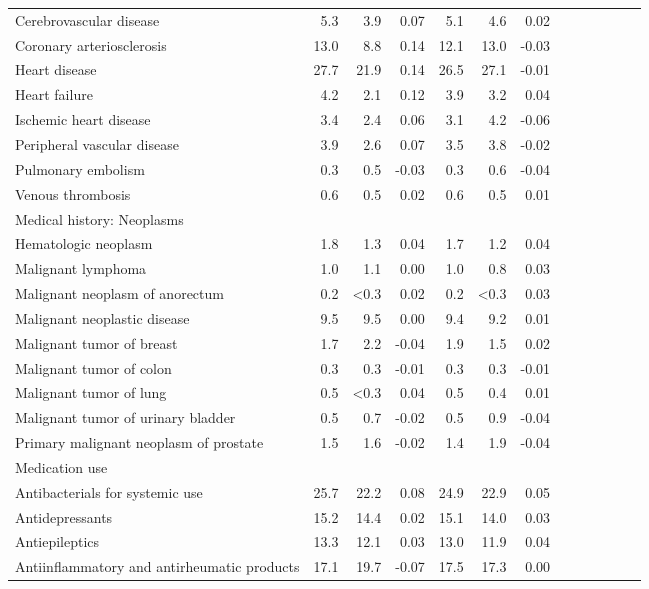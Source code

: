 \documentclass[11pt,]{article}
\begin{document}
\begin{longtable}{lrrrrrrrrrrrr}
      Cerebrovascular disease &  5.3 &  3.9 &  0.07 &  5.1 &  4.6 &  0.02 \\ 
      Coronary arteriosclerosis & 13.0 &  8.8 &  0.14 & 12.1 & 13.0 & -0.03 \\ 
      Heart disease & 27.7 & 21.9 &  0.14 & 26.5 & 27.1 & -0.01 \\ 
      Heart failure &  4.2 &  2.1 &  0.12 &  3.9 &  3.2 &  0.04 \\ 
      Ischemic heart disease &  3.4 &  2.4 &  0.06 &  3.1 &  4.2 & -0.06 \\ 
      Peripheral vascular disease &  3.9 &  2.6 &  0.07 &  3.5 &  3.8 & -0.02 \\ 
      Pulmonary embolism &  0.3 &  0.5 & -0.03 &  0.3 &  0.6 & -0.04 \\ 
      Venous thrombosis &  0.6 &  0.5 &  0.02 &  0.6 &  0.5 &  0.01 \\ 
  Medical history: Neoplasms &    &    &     &    &    &     \\ 
      Hematologic neoplasm &  1.8 &  1.3 &  0.04 &  1.7 &  1.2 &  0.04 \\ 
      Malignant lymphoma &  1.0 &  1.1 &  0.00 &  1.0 &  0.8 &  0.03 \\ 
      Malignant neoplasm of anorectum &  0.2 & <0.3 &  0.02 &  0.2 & <0.3 &  0.03 \\ 
      Malignant neoplastic disease &  9.5 &  9.5 &  0.00 &  9.4 &  9.2 &  0.01 \\ 
      Malignant tumor of breast &  1.7 &  2.2 & -0.04 &  1.9 &  1.5 &  0.02 \\ 
      Malignant tumor of colon &  0.3 &  0.3 & -0.01 &  0.3 &  0.3 & -0.01 \\ 
      Malignant tumor of lung &  0.5 & <0.3 &  0.04 &  0.5 &  0.4 &  0.01 \\ 
      Malignant tumor of urinary bladder &  0.5 &  0.7 & -0.02 &  0.5 &  0.9 & -0.04 \\ 
      Primary malignant neoplasm of prostate &  1.5 &  1.6 & -0.02 &  1.4 &  1.9 & -0.04 \\ 
  Medication use &    &    &     &    &    &     \\ 
      Antibacterials for systemic use & 25.7 & 22.2 &  0.08 & 24.9 & 22.9 &  0.05 \\ 
      Antidepressants & 15.2 & 14.4 &  0.02 & 15.1 & 14.0 &  0.03 \\ 
      Antiepileptics & 13.3 & 12.1 &  0.03 & 13.0 & 11.9 &  0.04 \\ 
      Antiinflammatory and antirheumatic products & 17.1 & 19.7 & -0.07 & 17.5 & 17.3 &  0.00 \\ 

\end{longtable}
\end{document}
